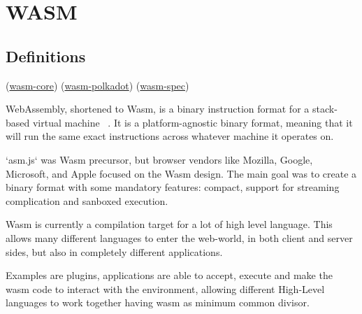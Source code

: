 \documentclass[../main.tex]{subfiles}
\begin{document}
\section{WASM}
\subsection{Definitions}
(\href{https://webassembly.github.io/spec/core/}{wasm-core})
(\href{}{wasm-polkadot})
(\href{https://www.ngzhian.com/relaxed-simd/core/_download/WebAssembly.pdf}{wasm-spec})


WebAssembly, shortened to Wasm, is a binary instruction format for a stack-based virtual machine ~\cite{wasm-core-spec}. It is a platform-agnostic binary format, meaning that it will run the same exact instructions across whatever machine it operates on. ~\cite{wasm-polkadot-wiki}

`asm.js` was Wasm precursor, but browser vendors like Mozilla, Google, Microsoft, and Apple focused on the Wasm design. The main goal was to create a binary format with some mandatory features: compact, support for streaming complication and sanboxed execution.


Wasm is currently a compilation target for a lot of high level language. This allows many different languages to enter the web-world, in both client and server sides, but also in completely different applications.

Examples are plugins, applications are able to accept, execute and make the wasm code to interact with the environment, allowing different High-Level languages to work together having wasm as minimum common divisor.
\end{document}
